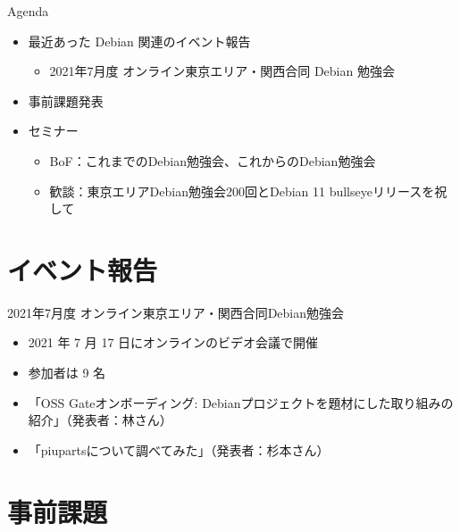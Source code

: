 \begin{frame}{Agenda}
 \begin{minipage}[t]{0.45\hsize}
  \begin{itemize}
  \item 最近あった Debian 関連のイベント報告
    \begin{itemize}
    \item 2021年7月度 オンライン東京エリア・関西合同 Debian 勉強会
    \end{itemize}
  \item 事前課題発表
  \end{itemize}
 \end{minipage}
 \begin{minipage}[t]{0.45\hsize}
   \begin{itemize}
   \item セミナー
     \begin{itemize}
      \item BoF：これまでのDebian勉強会、これからのDebian勉強会
      \item 歓談：東京エリアDebian勉強会200回とDebian 11 bullseyeリリースを祝して
     \end{itemize}
  \end{itemize}
 \end{minipage}
\end{frame}

\section{イベント報告}

\begin{frame}{2021年7月度 オンライン東京エリア・関西合同Debian勉強会}
\begin{itemize}
\item 2021 年 7 月 17 日にオンラインのビデオ会議で開催
\item 参加者は 9 名
\item 「OSS Gateオンボーディング: Debianプロジェクトを題材にした取り組みの紹介」（発表者：林さん）
\item 「piupartsについて調べてみた」（発表者：杉本さん）
\end{itemize}
\end{frame}

\section{事前課題}

